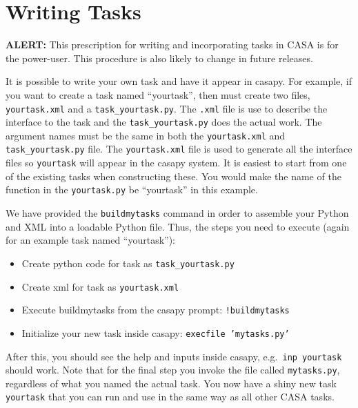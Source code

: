 

\chapter[Appendix: Writing Tasks in CASA]{Writing Tasks}
\label{chapter:write}

{\bf ALERT:} This prescription for writing and incorporating
tasks in CASA is for the power-user.  This procedure is also likely
to change in future releases.

It is possible to write your own task and have it appear in
casapy. For example, if you want to create a task named ``yourtask'',
then must create two files, {\tt yourtask.xml} and a
{\tt task\_yourtask.py}. The {\tt .xml} file is use to describe the interface to
the task and the {\tt task\_yourtask.py} does the actual work.  The argument
names must be the same in both the {\tt yourtask.xml} and {\tt task\_yourtask.py}
file. The {\tt yourtask.xml} file is used to generate all the interface
files so {\tt yourtask} will appear in the casapy system.  It is
easiest to start from one of the existing tasks when constructing
these.  You would make the name of the function in the 
{\tt  yourtask.py} be ``yourtask'' in this example.

We have provided the {\tt buildmytasks} command in order
to assemble your Python and XML into a loadable Python file.  Thus,
the steps you need to execute (again for an example task named ``yourtask''):
\begin{itemize}
\item Create python code for task as {\tt task\_yourtask.py}
\item Create xml for task as {\tt yourtask.xml}
\item Execute buildmytasks from the casapy prompt: {\tt !buildmytasks}
\item Initialize your new task inside casapy: {\tt execfile 'mytasks.py'}
\end{itemize}
After this, you should see the help and inputs inside casapy, e.g.\
{\tt inp yourtask} should work.  Note that for the final step you
invoke the file called {\tt mytasks.py}, regardless of what you named
the actual task. You now have a shiny new task {\tt yourtask} that you
can run and use in the same way as all other CASA tasks.


